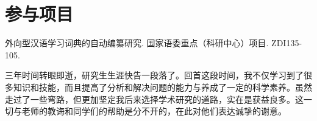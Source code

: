 \documentclass[doctor,final,oneside,continuousNum]{blcuthesis}
\begin{document}
	\section*{参与项目}
	\begin{enumerate}[label={[\arabic*]}]

		\item 外向型汉语学习词典的自动编纂研究. 国家语委重点（科研中心）项目. ZDI135-105.
	\end{enumerate}

	三年时间转眼即逝，研究生生涯快告一段落了。回首这段时间，我不仅学习到了很多知识和技能，而且提高了分析和解决问题的能力与养成了一定的科学素养。虽然走过了一些弯路，但更加坚定我后来选择学术研究的道路，实在是获益良多。这一切与老师的教诲和同学们的帮助是分不开的，在此对他们表达诚挚的谢意。
\end{document}
